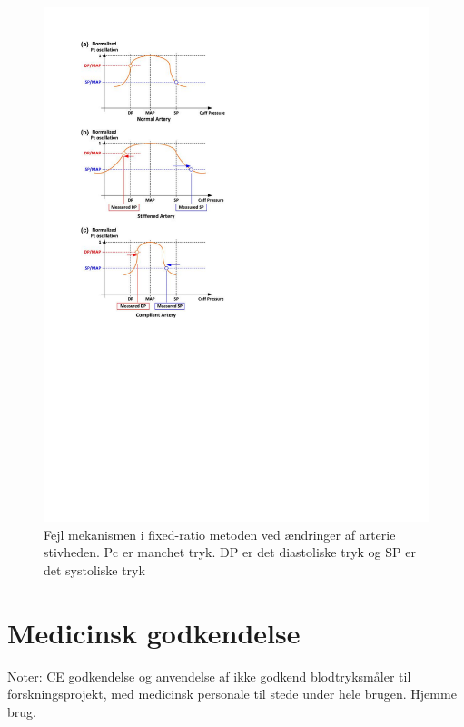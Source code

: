 \begin{minipage}[t]{0.5\textwidth}
	\begin{figure}[H]
		\centering
		\includegraphics[width=1\textwidth]{billeder/ErrorFixed-Ratio.pdf}
		\caption{Fejl mekanismen i fixed-ratio metoden ved ændringer af arterie stivheden. Pc er manchet tryk. DP er det diastoliske tryk og SP er det systoliske tryk}\label{fig:ErrorMechanismOfFixedRatio}
	\end{figure}
\end{minipage}

\section{Medicinsk godkendelse} \label{title:medGodkendelse}
Noter: CE godkendelse og anvendelse af ikke godkend blodtryksmåler til forskningsprojekt, med medicinsk personale til stede under hele brugen. Hjemme brug.


